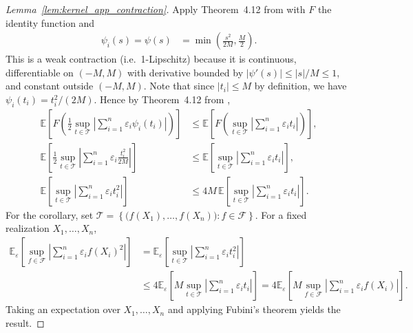 \documentclass[11pt,lof]{puthesis}
\newcommand{\E}{\ensuremath{\mathbb{E}}}
\newcommand{\cF}{\ensuremath{\mathcal{F}}}
\newcommand{\cT}{\ensuremath{\mathcal{T}}}
\theoremstyle{break}
\theoremstyle{proof}
\newtheorem{proof}{Proof}
\begin{document}
\begin{proof}[Lemma~\ref{lem:kernel_app_contraction}]

  Apply Theorem~4.12 from \citet{ledoux1991probability} with $F$ the identity
  function and
  \begin{align*}
    \psi_i(s)
    = \psi(s)
    &=
    \min
    \left(
      \frac{s^2}{2M},
      \frac{M}{2}
    \right).
  \end{align*}
  This is a weak contraction
  (i.e.\ 1-Lipschitz)
  because it is continuous,
  differentiable on $(-M,M)$
  with derivative bounded by
  $|\psi'(s)| \leq |s|/M \leq 1$,
  and constant outside $(-M,M)$.
  Note that since $|t_i| \leq M$
  by definition,
  we have $\psi_i(t_i) = t_i^2 / (2M)$.
  Hence
  by Theorem~4.12
  from \citet{ledoux1991probability},
  \begin{align*}
    \E
    \left[
      F
      \left(
        \frac{1}{2}
        \sup_{t \in \cT}
        \left|
          \sum_{i=1}^n
          \varepsilon_i
          \psi_i(t_i)
        \right|
      \right)
    \right]
    &\leq
    \E
    \left[
      F
      \left(
        \sup_{t \in \cT}
        \left|
          \sum_{i=1}^n
          \varepsilon_i
          t_i
        \right|
      \right)
    \right], \\
    \E
    \left[
      \frac{1}{2}
      \sup_{t \in \cT}
      \left|
        \sum_{i=1}^n
        \varepsilon_i
        \frac{t_i^2}{2M}
      \right|
    \right]
    &\leq
    \E
    \left[
      \sup_{t \in \cT}
      \left|
        \sum_{i=1}^n
        \varepsilon_i
        t_i
      \right|
    \right], \\
    \E
    \left[
      \sup_{t \in \cT}
      \left|
        \sum_{i=1}^n
        \varepsilon_i
        t_i^2
      \right|
    \right]
    &\leq
    4M \,
    \E
    \left[
      \sup_{t \in \cT}
      \left|
        \sum_{i=1}^n
        \varepsilon_i
        t_i
      \right|
    \right].
  \end{align*}
  For the corollary, set
  $\cT = \left\{\big(f(X_1), \ldots, f(X_n)\big) : f \in \cF\right\}$.
  For a fixed realization
  $X_1, \ldots, X_n$,
  \begin{align*}
    \E_\varepsilon
    \left[
      \sup_{f \in \cF}
      \left|
        \sum_{i=1}^n
        \varepsilon_i
        f(X_i)^2
      \right|
    \right]
    &=
    \E_\varepsilon
    \left[
      \sup_{t \in \cT}
      \left|
        \sum_{i=1}^n
        \varepsilon_i
        t_i^2
      \right|
    \right] \\
    &\leq 4
    \E_\varepsilon
    \left[
      M
      \sup_{t \in \cT}
      \left|
        \sum_{i=1}^n
        \varepsilon_i
        t_i
      \right|
    \right]
    = 4 \E_\varepsilon
    \left[
      M
      \sup_{f \in \cF}
      \left|
        \sum_{i=1}^n
        \varepsilon_i
        f(X_i)
      \right|
    \right].
  \end{align*}
  Taking an expectation over $X_1, \ldots, X_n$
  and applying Fubini's theorem yields the result.
\end{proof}
\end{document}

